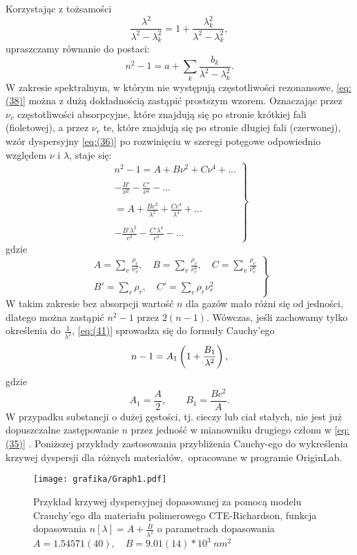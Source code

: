 Korzystając z tożsamości
$$\frac{\lambda^2}{\lambda^2-\lambda_k^2}=1+\frac{\lambda_k^2}{\lambda^2-\lambda_k^2},$$
upraszczamy równanie do postaci:
\begin{equation}\label{eq:(38)}
    n^2-1=a+\sum_{k}^{}\frac{b_k}{\lambda^2-\lambda_k^2}.
\end{equation}
W zakresie spektralnym, w którym nie występują częstotliwości rezonansowe, \ref{eq:(38)} można z dużą dokładnością zastąpić prostszym wzorem. Oznaczając przez $\nu_v$ częstotliwości absorpcyjne, które znajdują się po stronie krótkiej fali (fioletowej), a przez $\nu_r$ te, które znajdują się po stronie długiej fali (czerwonej), wzór dyspersyjny \ref{eq:(36)} po rozwinięciu w szeregi potęgowe odpowiednio względem $\nu$ i $\lambda$, staje się:
\begin{equation}\label{eq:(41)}
    \left.\begin{matrix}
    n^2-1 = A + B\nu^2+C\nu^4+...\\ 
    \\
              - \frac{B'}{\nu^2} - \frac{C'}{\nu^4} - ...\\
              \\
          = A+\frac{Bc^2}{\lambda^2}+\frac{Cc^4}{\lambda^4}+...\\
          \\
              - \frac{B'\lambda^2}{c^2}-\frac{C'\lambda^4}{c^4} - ...
\end{matrix}\right\}
\end{equation}
gdzie
$$
\left.\begin{matrix}
    A=\sum_{v}^{}\frac{\rho_v}{\nu_v^2},\quad B=\sum_{v}^{}\frac{\rho_v}{\nu_v^4},\quad C=\sum_{v}^{}\frac{\rho_v}{\nu_v^6}\\ 
    \\
    B'=\sum_{r}^{}\rho_r,\quad C'=\sum_{r}^{}\rho_r \nu^2_r
\end{matrix}\right\}
$$
W takim zakresie bez absorpcji wartość $n$  dla gazów mało różni się od jedności, dlatego można zastąpić $n^2-1$ przez $2(n-1)$. Wówczas, jeśli zachowamy tylko określenia do $\frac{1}{\lambda^2}$, \ref{eq:(41)} sprowadza się do formuły Cauchy'ego
$$n-1=A_1\left({1+\frac{B_1}{\lambda^2}}\right),$$
gdzie
$$A_1=\frac{A}{2}, \qquad B_1=\frac{Bc^2}{A}.$$
W przypadku substancji o dużej gęstości, tj. cieczy lub ciał stałych, nie jest już dopuszczalne zastępowanie $n$ przez jedność w mianowniku drugiego członu w \ref{eq:(35)} \cite{born2013principles}. Poniższej przykłady zastosowania przybliżenia Cauchy-ego do wykreślenia krzywej dyspersji dla różnych materiałów,~opracowane w programie OriginLab.
\begin{figure}[H]
    \centering
    \texttt{[image: grafika/Graph1.pdf]}
    \caption{Przykład krzywej dyspersyjnej dopasowanej za pomocą modelu Crauchy'ego dla materiału polimerowego CTE-Richardson, funkcja dopasowania $n[\lambda]=A+\frac{B}{\lambda^2}$ o parametrach dopasowania $A=1.54571(40),\quad B=9.01(14) * 10^3~nm^2$ \cite{Sultanova2013}}
\end{figure}

